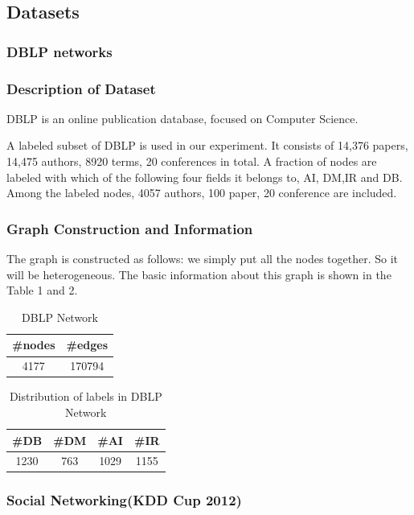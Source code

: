 \subsection{Datasets}
\subsubsection{DBLP networks}
\subsubsection*{Description of Dataset}
DBLP is an online publication database, focused on Computer Science. 

A labeled subset of DBLP is used in our experiment. It consists of 14,376 papers, 14,475 authors, 8920 terms, 20 conferences in total. A fraction of nodes are labeled with which of the following four fields it belongs to, AI, DM,IR and DB. Among the labeled nodes, 4057 authors, 100 paper, 20 conference are included.
\subsubsection*{Graph Construction and Information}
The graph is constructed as follows: we simply put all the nodes together. So it will be heterogeneous. The basic information about this graph is shown in the Table 1 and 2.

\begin{table}[!ht]
\centering
\begin{tabular}{cc}
\toprule
\textbf{\#nodes} & \textbf{\#edges}\\
\midrule
4177 & 170794\\
\bottomrule
\end{tabular}
\caption{DBLP Network}
\end{table}

\begin{table}[!ht]
\centering
\begin{tabular}{cccc}
\toprule
\textbf{\#DB} & \textbf{\#DM} & \textbf{\#AI} & \textbf{\#IR}\\
\midrule
1230 & 763 & 1029 & 1155\\
\bottomrule
\end{tabular}
\caption{Distribution of labels in DBLP Network}
\end{table}

\subsubsection{Social Networking(KDD Cup 2012)}

